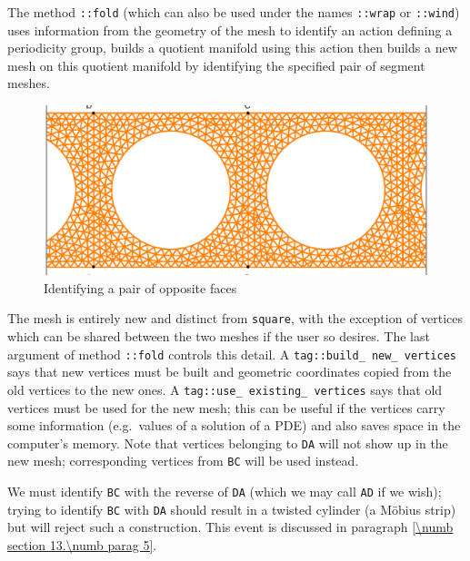 The method {\small\tt{}::fold} (which can also be used under the names
{\small\tt{}::wrap} or {\small\tt{}::wind}) uses information
from the geometry of the mesh to identify an action defining a periodicity group,
builds a quotient manifold using this action then builds a new mesh on this quotient manifold
by identifying the specified pair of segment meshes.

\begin{figure}[ht] \centering
  \includegraphics[width=120mm]{cylinder-1.eps}
  \caption{Identifying a pair of opposite faces}
  \label{\numb section 7.\numb fig 10}
\end{figure}

The mesh {\small\tt{}} is entirely new and distinct from {\small\tt square},
with the exception of vertices which can be shared between the two meshes if the
user so desires.
The last argument of method {\small\tt{}::fold} controls this detail.
A {\small\tt\textcolor{tag}{tag}::build\_\,new\_\,vertices} says that new vertices must be built
and geometric coordinates copied from the old vertices to the new ones.
A {\small\tt\textcolor{tag}{tag}::use\_\,existing\_\,vertices} says that old vertices must be used
for the new mesh; this can be useful if the vertices carry some information
(e.g.\ values of a solution of a PDE) and also saves space in the computer's memory.
Note that vertices belonging to {\small\tt DA} will not show up in the
new mesh; corresponding vertices from {\small\tt BC} will be used instead.

We must identify {\small\tt BC} with the reverse of {\small\tt DA} (which we may call
{\small\tt AD} if we wish); trying to identify {\small\tt BC} with {\small\tt DA} should
result in a twisted cylinder (a M\"obius strip) but {\maniFEM} will reject such a construction.
This event is discussed in paragraph \ref{\numb section 13.\numb parag 5}.


